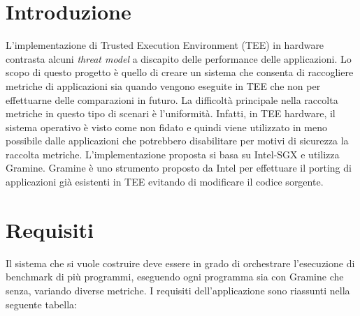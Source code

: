 \documentclass{article}
\begin{document}
\section*{Introduzione}
L'implementazione di Trusted Execution Environment (TEE) in hardware contrasta alcuni \textit{threat model} a discapito delle performance delle applicazioni. Lo scopo di questo progetto è quello di creare un sistema che consenta di raccogliere metriche di applicazioni sia quando vengono eseguite in TEE che non per effettuarne delle comparazioni in futuro. La difficoltà principale nella raccolta metriche in questo tipo di scenari è l'uniformità. Infatti, in TEE hardware, il sistema operativo è visto come non fidato e quindi viene utilizzato in meno possibile dalle applicazioni che potrebbero disabilitare per motivi di sicurezza la raccolta metriche.
L'implementazione proposta si basa su Intel-SGX e utilizza Gramine. Gramine è uno strumento proposto da Intel per effettuare il porting di applicazioni già esistenti in TEE evitando di modificare il codice sorgente.

\clearpage
\section{Requisiti}
Il sistema che si vuole costruire deve essere in grado di orchestrare l'esecuzione di benchmark di più programmi, eseguendo ogni programma sia con Gramine che senza, variando diverse metriche. I requisiti dell'applicazione sono riassunti nella seguente tabella:
\end{document}
